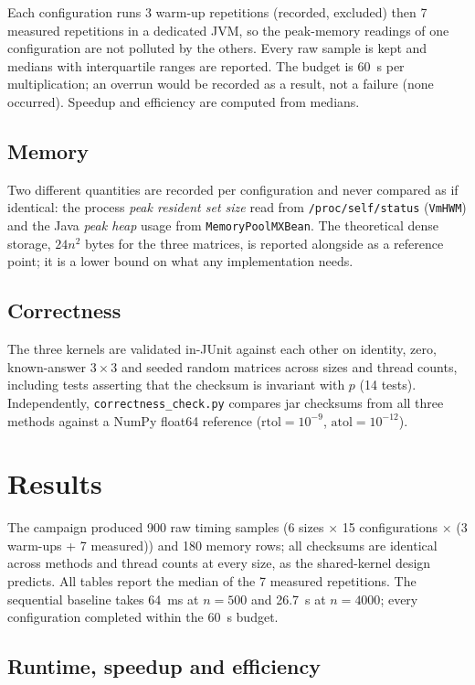 \documentclass[11pt,a4paper]{article}
\begin{document}
Each configuration runs 3 warm-up repetitions (recorded, excluded) then 7
measured repetitions in a dedicated JVM, so the peak-memory readings of one
configuration are not polluted by the others. Every raw sample is kept and
medians with interquartile ranges are reported. The budget is 60~s per
multiplication; an overrun would be recorded as a result, not a failure
(none occurred). Speedup and efficiency are computed from medians.

\subsection{Memory}

Two different quantities are recorded per configuration and never compared
as if identical: the process \emph{peak resident set size} read from
\texttt{/proc/self/status} (\texttt{VmHWM}) and the Java \emph{peak heap}
usage from \texttt{MemoryPoolMXBean}. The theoretical dense storage,
$24n^2$ bytes for the three matrices, is reported alongside as a reference
point; it is a lower bound on what any implementation needs.

\subsection{Correctness}

The three kernels are validated in-JUnit against each other on identity,
zero, known-answer $3 \times 3$ and seeded random matrices across sizes and
thread counts, including tests asserting that the checksum is invariant
with $p$ (14 tests). Independently, \texttt{correctness\_check.py} compares
jar checksums from all three methods against a NumPy float64 reference
($\mathrm{rtol} = 10^{-9}$, $\mathrm{atol} = 10^{-12}$).

\section{Results}
\label{sec:results}

The campaign produced 900 raw timing samples (6 sizes $\times$ 15
configurations $\times$ (3 warm-ups + 7 measured)) and 180 memory rows; all
checksums are identical across methods and thread counts at every size, as
the shared-kernel design predicts. All tables report the median of the 7
measured repetitions. The sequential baseline takes 64~ms at $n = 500$ and
26.7~s at $n = 4000$; every configuration completed within the 60~s budget.

\subsection{Runtime, speedup and efficiency}
\end{document}
